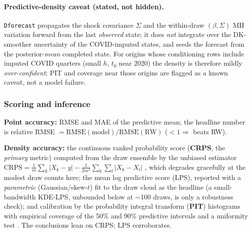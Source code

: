 \documentclass[11pt]{article}
\theoremstyle{definition}
\theoremstyle{remark}
\begin{document}
\paragraph{Predictive-density caveat (stated, not hidden).}
\texttt{Dforecast} propagates the shock covariance $\Sigma$ and the
within-draw $(\beta,\Sigma)$ MH variation forward from the last
\emph{observed} state; it does \emph{not} integrate over the
DK-smoother uncertainty of the COVID-imputed states, and seeds the
forecast from the posterior-\emph{mean} completed state. For origins
whose conditioning rows include imputed COVID quarters (small $h$, $t_0$
near 2020) the density is therefore mildly \emph{over-confident}; PIT and
coverage near those origins are flagged as a known caveat, not a model
failure.

\subsubsection{Scoring and inference}\label{sec:empirical:scoring}

\textbf{Point accuracy:} RMSE and MAE of the predictive mean; the
headline number is relative RMSE $=\mathrm{RMSE(model)}/\mathrm{RMSE(RW)}$
($<1\Rightarrow$ beats RW).

\textbf{Density accuracy:} the continuous ranked probability score
(\textbf{CRPS}, the \emph{primary} metric) computed from the draw
ensemble by the unbiased estimator
\(\mathrm{CRPS}=\tfrac1m\sum_k|X_k-y|-\tfrac1{2m^2}\sum_{k}\sum_{l}|X_k-X_l|\)
\citep{GneitingRaftery2007}, which degrades gracefully at the modest
draw counts here; the mean log predictive score (LPS), reported with a
\emph{parametric} (Gaussian/skew-$t$) fit to the draw cloud as the
headline (a small-bandwidth KDE-LPS, unbounded below at $\sim$100 draws,
is only a robustness check); and calibration by the probability integral
transform (\textbf{PIT}) histograms with empirical coverage of the 50\%
and 90\% predictive intervals and a uniformity test
\citep{Berkowitz2001}. The conclusions lean on CRPS; LPS corroborates.
\end{document}
